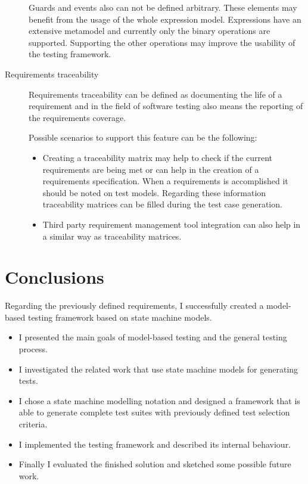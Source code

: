 \begin{description}
	Guards and events also can not be defined arbitrary. These elements may benefit from the usage of the whole expression model. Expressions have an extensive metamodel and currently only the binary operations are supported. Supporting the other operations may improve the usability of the testing framework.
	\item[Requirements traceability] Requirements traceability can be defined as documenting the life of a requirement and in the field of software testing also means the reporting of the requirements coverage.
	
	Possible scenarios to support this feature can be the following:
	
	\begin{itemize}
		\item Creating a traceability matrix may help to check if the current requirements are being met or can help in the creation of a requirements specification. When a requirements is accomplished it should be noted on test models. Regarding these information traceability matrices can be filled during the test case generation.
		\item Third party requirement management tool integration can also help in a similar way as traceability matrices.
	\end{itemize}
\end{description}


\section{Conclusions}
\label{sec:conclusions}

Regarding the previously defined requirements, I successfully created a model-based testing framework based on state machine models.

\begin{itemize}
	\item I presented the main goals of model-based testing and the general testing process.
	\item I investigated the related work that use state machine models for generating tests.
	\item I chose a state machine modelling notation and designed a framework that is able to generate complete test suites with previously defined test selection criteria.
	\item I implemented the testing framework and described its internal behaviour.
	\item Finally I evaluated the finished solution and sketched some possible future work.
\end{itemize}

